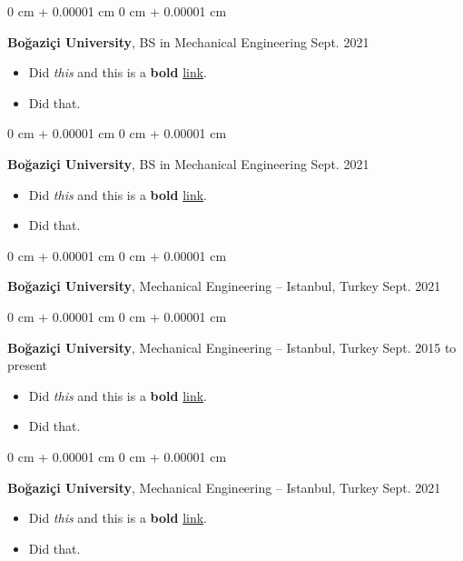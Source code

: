 \documentclass[10pt, letterpaper]{article}
\newenvironment{highlights}{
    \begin{itemize}[
        topsep=0.10 cm,
        parsep=0.10 cm,
        partopsep=0pt,
        itemsep=0pt,
        leftmargin=0 cm + 10pt
    ]
}{
    \end{itemize}
        
    \vspace{-0.20cm}
} %
\newenvironment{onecolentry}{
    \begin{adjustwidth}{
        0 cm + 0.00001 cm
    }{
        0 cm + 0.00001 cm
    }
}{
    \end{adjustwidth}
} %
\begin{document}
        \begin{onecolentry}
            \textbf{Boğaziçi University}, BS in Mechanical Engineering \hfill Sept. 2021
            \begin{highlights}
                \item Did \textit{this} and this is a \textbf{bold} \href{https://example.com}{link}.
                \item Did that.
            \end{highlights}
        \end{onecolentry}

        \vspace{0.1 cm}

        \begin{onecolentry}
            \textbf{Boğaziçi University}, BS in Mechanical Engineering \hfill Sept. 2021
            \begin{highlights}
                \item Did \textit{this} and this is a \textbf{bold} \href{https://example.com}{link}.
                \item Did that.
            \end{highlights}
        \end{onecolentry}

        \vspace{0.1 cm}

        \begin{onecolentry}
            \textbf{Boğaziçi University}, Mechanical Engineering -- Istanbul, Turkey \hfill Sept. 2021
        \end{onecolentry}

        \vspace{0.1 cm}

        \begin{onecolentry}
            \textbf{Boğaziçi University}, Mechanical Engineering -- Istanbul, Turkey \hfill Sept. 2015 to present
            \begin{highlights}
                \item Did \textit{this} and this is a \textbf{bold} \href{https://example.com}{link}.
                \item Did that.
            \end{highlights}
        \end{onecolentry}

        \vspace{0.1 cm}

        \begin{onecolentry}
            \textbf{Boğaziçi University}, Mechanical Engineering -- Istanbul, Turkey \hfill Sept. 2021
            \begin{highlights}
                \item Did \textit{this} and this is a \textbf{bold} \href{https://example.com}{link}.
                \item Did that.
            \end{highlights}
        \end{onecolentry}
\end{document}
